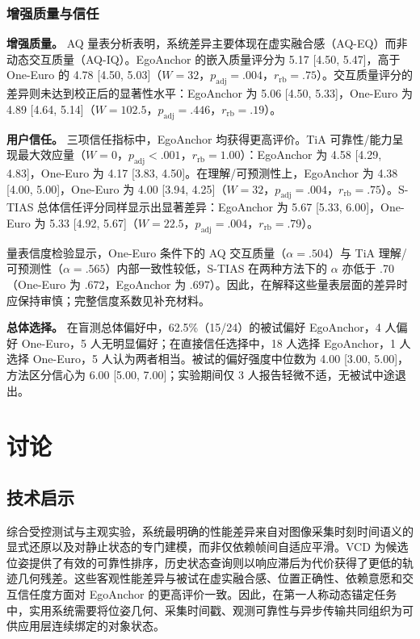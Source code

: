 \documentclass[review]{vgtc}
\begin{document}
\subsubsection{增强质量与信任}

\textbf{增强质量。}
AQ 量表分析表明，系统差异主要体现在虚实融合感（AQ-EQ）而非动态交互质量（AQ-IQ）。EgoAnchor 的嵌入质量评分为 5.17 [4.50, 5.47]，高于 One-Euro 的 4.78 [4.50, 5.03]（$W=32$，$p_{\mathrm{adj}}=.004$，$r_{\mathrm{rb}}=.75$）。交互质量评分的差异则未达到校正后的显著性水平：EgoAnchor 为 5.06 [4.50, 5.33]，One-Euro 为 4.89 [4.64, 5.14]（$W=102.5$，$p_{\mathrm{adj}}=.446$，$r_{\mathrm{rb}}=.19$）。

\textbf{用户信任。}
三项信任指标中，EgoAnchor 均获得更高评价。TiA 可靠性/能力呈现最大效应量（$W=0$，$p_{\mathrm{adj}}<.001$，$r_{\mathrm{rb}}=1.00$）：EgoAnchor 为 4.58 [4.29, 4.83]，One-Euro 为 4.17 [3.83, 4.50]。在理解/可预测性上，EgoAnchor 为 4.38 [4.00, 5.00]，One-Euro 为 4.00 [3.94, 4.25]（$W=32$，$p_{\mathrm{adj}}=.004$，$r_{\mathrm{rb}}=.75$）。S-TIAS 总体信任评分同样显示出显著差异：EgoAnchor 为 5.67 [5.33, 6.00]，One-Euro 为 5.33 [4.92, 5.67]（$W=22.5$，$p_{\mathrm{adj}}=.004$，$r_{\mathrm{rb}}=.79$）。

量表信度检验显示，One-Euro 条件下的 AQ 交互质量（$\alpha=.504$）与 TiA 理解/可预测性（$\alpha=.565$）内部一致性较低，S-TIAS 在两种方法下的 $\alpha$ 亦低于 .70（One-Euro 为 $.672$，EgoAnchor 为 $.697$）。因此，在解释这些量表层面的差异时应保持审慎；完整信度系数见补充材料。

\textbf{总体选择。}
在盲测总体偏好中，62.5\%（15/24）的被试偏好 EgoAnchor，4 人偏好 One-Euro，5 人无明显偏好；在直接信任选择中，18 人选择 EgoAnchor，1 人选择 One-Euro，5 人认为两者相当。被试的偏好强度中位数为 4.00 [3.00, 5.00]，方法区分信心为 6.00 [5.00, 7.00]；实验期间仅 3 人报告轻微不适，无被试中途退出。

\section{讨论}\label{sec:discussion}

\subsection{技术启示}

综合受控测试与主观实验，系统最明确的性能差异来自对图像采集时刻时间语义的显式还原以及对静止状态的专门建模，而非仅依赖帧间自适应平滑。VCD 为候选位姿提供了有效的可靠性排序，历史状态查询则以响应滞后为代价获得了更低的轨迹几何残差。这些客观性能差异与被试在虚实融合感、位置正确性、依赖意愿和交互信任度方面对 EgoAnchor 的更高评价一致。因此，在第一人称动态锚定任务中，实用系统需要将位姿几何、采集时间戳、观测可靠性与异步传输共同组织为可供应用层连续绑定的对象状态。
\end{document}
